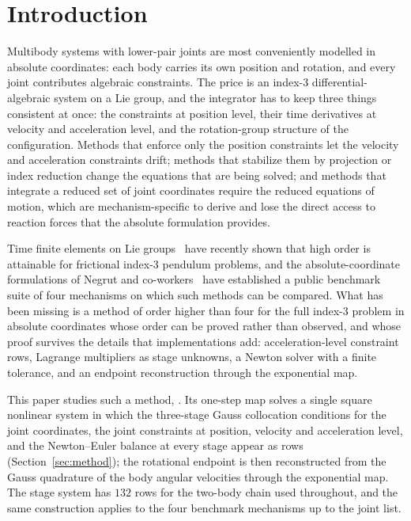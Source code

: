\section{Introduction}
\label{sec:intro}

Multibody systems with lower-pair joints are most conveniently modelled in absolute coordinates:
each body carries its own position and rotation, and every joint contributes algebraic constraints.
The price is an index-3 differential-algebraic system on a Lie group, and the integrator has to keep
three things consistent at once: the constraints at position level, their time derivatives at
velocity and acceleration level, and the rotation-group structure of the configuration. Methods
that enforce only the position constraints let the velocity and acceleration constraints drift;
methods that stabilize them by projection or index reduction change the equations that are being
solved; and methods that integrate a reduced set of joint coordinates require the reduced equations
of motion, which are mechanism-specific to derive and lose the direct access to reaction forces
that the absolute formulation provides.

Time finite elements on Lie groups~\cite{chaturvedi2026tfe} have recently shown that high order is
attainable for frictional index-3 pendulum problems, and the absolute-coordinate formulations of
Negrut and co-workers~\cite{taves2020exponential,kissel2021dwelling,kissel2022absolute,fang2023halfimplicit}
have established a public benchmark suite of four mechanisms on which such methods can be compared.
What has been missing is a method of order higher than four for the full index-3 problem in
absolute coordinates whose order can be proved rather than observed, and whose proof survives the
details that implementations add: acceleration-level constraint rows, Lagrange multipliers as stage
unknowns, a Newton solver with a finite tolerance, and an endpoint reconstruction through the
exponential map.

This paper studies such a method, \method{}. Its one-step map solves a single square nonlinear
system in which the three-stage Gauss collocation conditions for the joint coordinates, the joint
constraints at position, velocity and acceleration level, and the Newton--Euler balance at every
stage appear as rows (Section~\ref{sec:method}); the rotational endpoint is then reconstructed from
the Gauss quadrature of the body angular velocities through the exponential map. The stage system
has $132$ rows for the two-body chain used throughout, and the same construction applies to the
four benchmark mechanisms up to the joint list.

